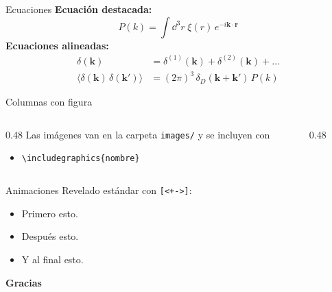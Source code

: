 \documentclass[aspectratio=169]{beamer}
\newcommand{\kv}{\mathbf{k}}
\begin{document}
\begin{frame}{Ecuaciones}
  \textbf{Ecuación destacada:}
  \[
    P(k) = \int \dd^3 r \; \xi(r)\, e^{-i\kv\cdot\mathbf{r}}
  \]
  \textbf{Ecuaciones alineadas:}
  \begin{align*}
    \delta(\kv) &= \delta^{(1)}(\kv) + \delta^{(2)}(\kv) + \dots \\
    \langle \delta(\kv)\,\delta(\kv') \rangle &= (2\pi)^3\, \delta_D(\kv+\kv')\, P(k)
  \end{align*}
\end{frame}

\begin{frame}{Columnas con figura}
  \begin{columns}[c]
    \begin{column}{0.48\textwidth}
      Las imágenes van en la carpeta \texttt{images/} y se incluyen con
      \begin{itemize}
        \item \texttt{\textbackslash includegraphics\{nombre\}}
      \end{itemize}
    \end{column}
    \begin{column}{0.48\textwidth}
      \centering
    \end{column}
  \end{columns}
\end{frame}

\begin{frame}{Animaciones}
  Revelado estándar con \texttt{[<+->]}:
  \begin{itemize}[<+->]
    \item Primero esto.
    \item Después esto.
    \item Y al final esto.
  \end{itemize}
\end{frame}

\begin{frame}
  \centering
  {\Large \textbf{Gracias}}
\end{frame}
\end{document}
